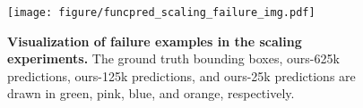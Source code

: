 \begin{figure}[th]
    \centering
    \texttt{[image: figure/funcpred\_scaling\_failure\_img.pdf]}
    \caption{\textbf{Visualization of failure examples in the scaling experiments.} The ground truth bounding boxes, ours-625k predictions, ours-125k predictions, and ours-25k predictions are drawn in \textcolor[rgb]{0, 0.6, 0.13}{green}, \textcolor[rgb]{1.0, 0.0, 1.0}{pink}, \textcolor[rgb]{0.0, 0.4, 0.8}{blue}, and \textcolor[rgb]{1.0, 0.65, 0.0}{orange}, respectively.}
    \label{fig:funcpred scaling failure}
\end{figure}
